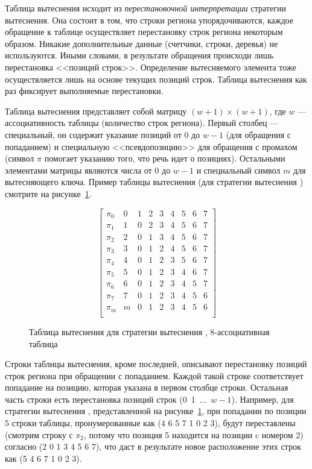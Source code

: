 Таблица вытеснения исходит из \emph{перестановочной интерпретации} стратегии
вытеснения. Она состоит в том, что строки региона упорядочиваются, каждое
обращение к таблице осуществляет перестановку строк региона некоторым образом.
Никакие дополнительные данные (счетчики, строки, деревья) не используются. Иными
словами, в результате обращения происходи лишь перестановка <<позиций строк>>.
Определение вытесняемого элемента тоже осуществляется лишь на основе текущих
позиций строк. Таблица вытеснения как раз фиксирует выполняемые перестановки.

Таблица вытеснения представляет собой матрицу $(w{+}1) \times (w{+}1)$, где $w$
--- ассоциативность таблицы (количество строк региона). Первый столбец ---
специальный, он содержит указание позиций от 0 до $w{-}1$ (для обращения с
попаданием) и
специальную <<псевдопозицию>> для обращения с промахом (символ $\pi$ помогает
указанию того, что речь идет о позициях). Остальными элементами
матрицы являются числа от 0 до $w{-}1$ и специальный символ $m$ для
вытесняющего ключа. Пример таблицы вытеснения (для стратегии
вытеснения \LRU) смотрите на рисунке~\ref{fig:PolicyTableLRU8}.

\begin{figure}[h]
$$ \left[
     \begin{array}{c|cccccccc}
       \pi_0 & 0 & 1 & 2 & 3 & 4 & 5 & 6 & 7 \\
       \pi_1 & 1 & 0 & 2 & 3 & 4 & 5 & 6 & 7 \\
       \pi_2 & 2 & 0 & 1 & 3 & 4 & 5 & 6 & 7 \\
       \pi_3 & 3 & 0 & 1 & 2 & 4 & 5 & 6 & 7 \\
       \pi_4 & 4 & 0 & 1 & 2 & 3 & 5 & 6 & 7 \\
       \pi_5 & 5 & 0 & 1 & 2 & 3 & 4 & 6 & 7 \\
       \pi_6 & 6 & 0 & 1 & 2 & 3 & 4 & 5 & 7 \\
       \pi_7 & 7 & 0 & 1 & 2 & 3 & 4 & 5 & 6 \\
       \pi_m & m & 0 & 1 & 2 & 3 & 4 & 5 & 6 \\
     \end{array}
   \right]
$$
\caption{Таблица вытеснения для стратегии вытеснения \LRU,
8-ассоциативная таблица}\label{fig:PolicyTableLRU8}
\end{figure}

Строки таблицы вытеснения, кроме последней, описывают перестановку позиций строк
региона при обращении с попаданием. Каждой такой строке соответствует попадание
на позицию, которая указана в первом столбце строки. Остальная часть строки есть
перестановка позиций строк (0~1~...~$w{-}1$). Например, для стратегии вытеснения
\LRU,
представленной на рисунке~\ref{fig:PolicyTableLRU8}, при попадании по позиции 5
строки таблицы, пронумерованные как (4 6 5 7 1 0 2 3), будут переставлены
(смотрим строку с $\pi_2$, потому что позиция 5 находится на позиции c номером
2) согласно (2 0 1 3 4 5 6 7), что даст в результате новое расположение этих
строк как (5 4 6 7 1 0 2 3).

